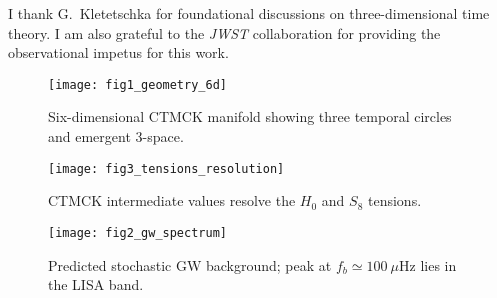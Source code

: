 \documentclass[reprint,amsmath,amssymb,aps,prd,nofootinbib,longbibliography]{revtex4-2}
\begin{document}
\begin{acknowledgments}
I thank G.~Kletetschka for foundational discussions on three-dimensional time theory. I am also grateful to the \textit{JWST} collaboration for providing the observational impetus for this work.
\end{acknowledgments}

\begin{figure}[t]
  \centering
  \texttt{[image: fig1\_geometry\_6d]}
  \caption{Six-dimensional CTMCK manifold showing three temporal circles and emergent 3-space.}
  \label{fig:geometry}
\end{figure}

\begin{figure}[t]
  \centering
  \texttt{[image: fig3\_tensions\_resolution]}
  \caption{CTMCK intermediate values resolve the $H_0$ and $S_8$ tensions.}
  \label{fig:tensions}
\end{figure}

\begin{figure}[t]
  \centering
  \texttt{[image: fig2\_gw\_spectrum]}
  \caption{Predicted stochastic GW background; peak at $f_b\simeq100\ \mu$Hz lies in the \textsc{LISA} band.}
  \label{fig:gw}
\end{figure}



\end{document}
